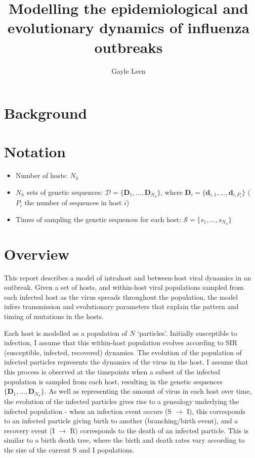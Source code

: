 \documentclass[a4paper,18pt]{report}
\title{Modelling the epidemiological and evolutionary dynamics of influenza outbreaks}
\author{Gayle Leen}
\begin{document}
\maketitle

\begin{abstract}

\end{abstract}

\section{Background}



\section{Notation}
\begin{itemize}
\item Number of hosts: $N_h$
\item $N_h$ sets of genetic sequences: $\mathcal{D} = \{\mathbf{D}_1,...,\mathbf{D}_{N_h}\}$, where $\mathbf{D}_i = \{\mathbf{d}_{i,1},...,\mathbf{d}_{i,P_i}\}$ ($P_i$ the number of sequences in host $i$)
\item Times of sampling the genetic sequences for each host: $\mathcal{S} = \{s_1,...,s_{N_h}\}$
\end{itemize}

\section{Overview}
This report describes a model of intrahost and between-host viral dynamics in an outbreak. Given a set of hosts, and within-host viral populations sampled from each infected host as the virus spreads throughout the population, the model infers transmission and evolutionary parameters                                                                   
that explain the pattern and timing of mutations in the hosts.

Each host is modelled as a population of $N$ `particles'. Initially susceptible to infection, I assume that this within-host population evolves according to SIR (susceptible, infected, recovered) dynamics. The evolution of the population of infected particles represents the dynamics of the virus in the host. I assume that this process is observed at the timepoints when a subset of the infected population is sampled from each host, resulting in the genetic sequences $\{\mathbf{D}_1,...,\mathbf{D}_{N_h}\}$. As well as representing the amount of virus in each host over time, the evolution of the infected particles gives rise to a genealogy underlying the infected population - when an infection event occurs (S $\rightarrow$ I), this corresponds to an infected particle giving birth to another (branching/birth event),
and a recovery event (I $\rightarrow$ R) corresponds to the death of an infected particle. This is similar to a birth death tree, where the birth and death rates vary according to the size of the current S and I populations.
\end{document}
